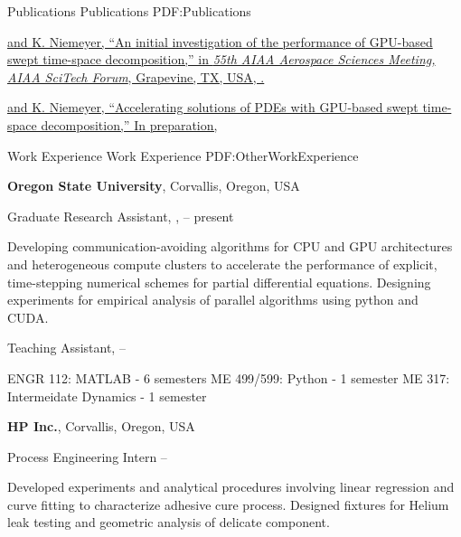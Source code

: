 \documentclass[letterpaper, MMMyyyy, nonstopmode]{simpleresumecv}
\begin{document}
\begin{Body}

\Section
{Publications}
{Publications}
{PDF:Publications}

\Gap
\href{https://arxiv.org/abs/1612.02495}
{\underline{} and K. Niemeyer,
``An initial investigation of the performance of GPU-based swept time-space decomposition,''
in \textit{55th AIAA Aerospace Sciences Meeting, AIAA SciTech Forum},
Grapevine, TX, USA,
.}

\href{https://arxiv.org/abs/1705.03162}
{\underline{} and K. Niemeyer,
	``Accelerating solutions of PDEs with GPU-based swept time-space decomposition,''
	 In preparation, }


\Section
{Work Experience}
{Work Experience}
{PDF:OtherWorkExperience}

\Entry
\textbf{Oregon State University},
Corvallis, Oregon, USA

\BulletItem
Graduate Research Assistant,
\href{https://niemeyer-research-group.github.io}
{\underline{}},
\hfill
{} --
present

\begin{Detail}
\SubBulletItem
Developing communication-avoiding algorithms for CPU and GPU architectures and heterogeneous compute clusters to accelerate the performance of explicit, time-stepping numerical schemes for partial differential equations.
\SubBulletItem
Designing experiments for empirical analysis of parallel algorithms using python and CUDA.
\end{Detail}
\Gap

\BulletItem
Teaching Assistant,
\hfill
{} --

\begin{Detail}
\SubBulletItem
ENGR 112: MATLAB - 6 semesters 
\SubBulletItem
ME 499/599: Python - 1 semester
\SubBulletItem
ME 317: Intermeidate Dynamics - 1 semester
\end{Detail}
\BigGap

\Entry
\textbf{HP Inc.},
Corvallis, Oregon, USA

\BulletItem
Process Engineering Intern
\hfill
{} --

\begin{Detail}
\SubBulletItem
Developed experiments and analytical procedures involving linear regression and curve fitting to characterize adhesive cure process.
\SubBulletItem
Designed fixtures for Helium leak testing and geometric analysis of delicate component.
\end{Detail}
\BigGap


\end{Body}
\end{document}
